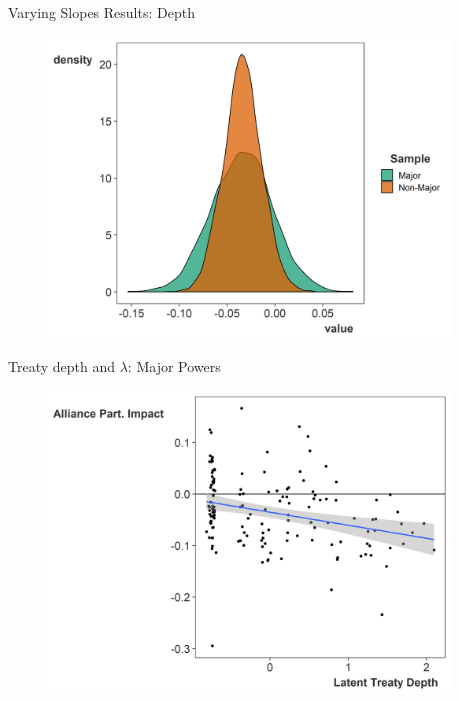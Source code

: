 \documentclass[12pt]{beamer}
\begin{document}
\begin{frame}{Varying Slopes Results: Depth}

\begin{figure}[htbp]
	\centering
		\includegraphics[width=0.95\textwidth]{var-slopes-depth.png}
\end{figure}

\end{frame}



\begin{frame}{Treaty depth and $\lambda$: Major Powers}

\begin{figure}
	\centering
		\includegraphics[width=0.95\textwidth]{ld-lambda-maj.png}
	\label{fig:ls-lambda-min}
\end{figure}


\end{frame}
\end{document}
